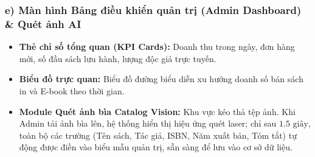 \documentclass[11pt, a4paper]{report}
\begin{document}
\subsubsection{e) Màn hình Bảng điều khiển quản trị (Admin Dashboard) \& Quét ảnh AI}
\begin{itemize}
    \item \textbf{Thẻ chỉ số tổng quan (KPI Cards):} Doanh thu trong ngày, đơn hàng mới, số đầu sách lưu hành, lượng độc giả trực tuyến.
    \item \textbf{Biểu đồ trực quan:} Biểu đồ đường biểu diễn xu hướng doanh số bán sách in và E-book theo thời gian.
    \item \textbf{Module Quét ảnh bìa Catalog Vision:} Khu vực kéo thả tệp ảnh. Khi Admin tải ảnh bìa lên, hệ thống hiển thị hiệu ứng quét laser; chỉ sau $1.5\text{ giây}$, toàn bộ các trường (Tên sách, Tác giả, ISBN, Năm xuất bản, Tóm tắt) tự động được điền vào biểu mẫu quản trị, sẵn sàng để lưu vào cơ sở dữ liệu.
\end{itemize}
\end{document}
